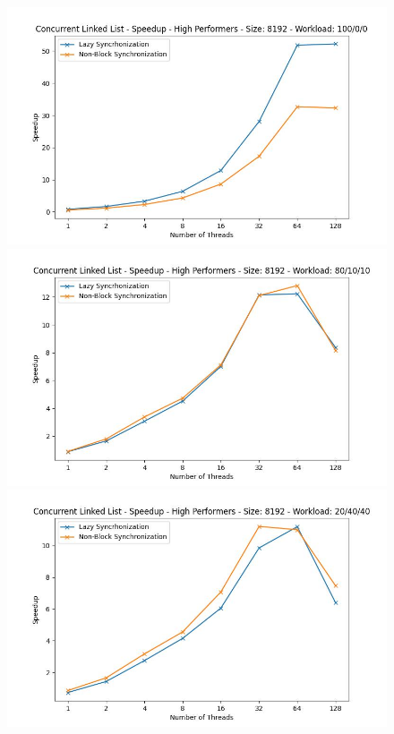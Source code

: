 \documentclass[../final_report.tex]{subfiles}
\begin{document}
\begin{figure}[H]
    \centering
        \includegraphics[scale=0.4]{outFiles/plots/concurrent_data_structs_high_speedup_8192_100_0_0.jpg}
        \includegraphics[scale=0.4]{outFiles/plots/concurrent_data_structs_high_speedup_8192_80_10_10.jpg}
        \includegraphics[scale=0.4]{outFiles/plots/concurrent_data_structs_high_speedup_8192_20_40_40.jpg}

\end{figure}
\end{document}
